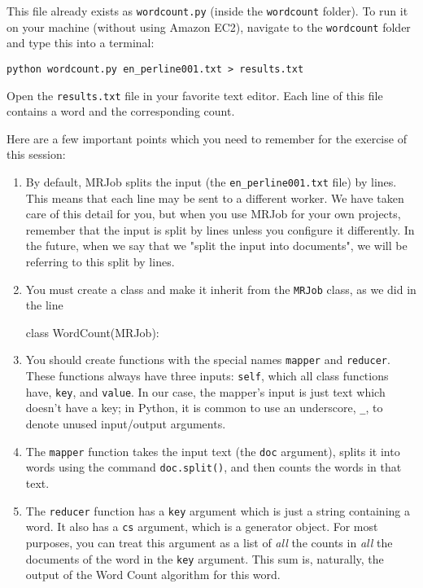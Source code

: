 This file already exists as \texttt{wordcount.py} (inside the
\texttt{wordcount} folder). To run it on your machine (without using Amazon
EC2), navigate to the \texttt{wordcount} folder and type this into a terminal:

\begin{verbatim}
python wordcount.py en_perline001.txt > results.txt
\end{verbatim}

Open the \texttt{results.txt} file in your favorite text editor. Each line of this file contains a word and the corresponding count.

Here are a few important points which you need to remember for the exercise of this session:
%
\begin{enumerate}
	\item By default, MRJob splits the input (the \texttt{en_perline001.txt} file) by lines. This means that each line may be sent to a different worker. We have taken care of this detail for you, but when you use MRJob for your own projects, remember that the input is split by lines unless you configure it differently. In the future, when we say that we "split the input into documents", we will be referring to this split by lines.
	\item You must create a class and make it inherit from the \texttt{MRJob} class, as we did in the line 	
\begin{python}
	class WordCount(MRJob):
\end{python}
	\item You should create functions with the special names \texttt{mapper} and \texttt{reducer}. These functions always have three inputs: \texttt{self}, which all class functions have, \texttt{key}, and \texttt{value}. In our case, the mapper's input is just text which doesn't have a key; in Python, it is common to use an underscore, \texttt{\_}, to denote unused input/output arguments.
	\item The \texttt{mapper} function takes the input text (the \texttt{doc} argument), splits it into words using the command \texttt{doc.split()}, and then counts the words in that text.
	\item The \texttt{reducer} function has a \texttt{key} argument which is just a string containing a word. It also has a \texttt{cs} argument, which is a generator object. For most purposes, you can treat this argument as a list of \emph{all} the counts in \emph{all} the documents of the word in the \texttt{key} argument. This sum is, naturally, the output of the Word Count algorithm for this word.
\end{enumerate}

